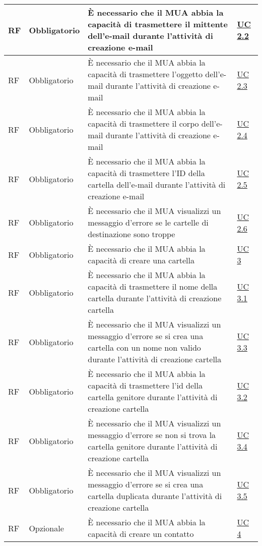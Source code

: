 \begin{longtable}{*{1}{>{\centering\arraybackslash}p{1.5cm}}*{1}{>{\centering\arraybackslash}p{2.5cm}}p{6cm}*{1}{>{\centering\arraybackslash}p{3cm}}}
    RF & Obbligatorio & È necessario che il MUA abbia la capacità di trasmettere il mittente dell'e-mail durante l'attività di creazione e-mail & \hyperref[sec:UC2.2]{UC 2.2}    \\\hline
    RF & Obbligatorio & È necessario che il MUA abbia la capacità di trasmettere l'oggetto dell'e-mail durante l'attività di creazione e-mail & \hyperref[sec:UC2.3]{UC 2.3}
    \\\hline
    RF & Obbligatorio & È necessario che il MUA abbia la capacità di trasmettere il corpo dell'e-mail durante l'attività di creazione e-mail & \hyperref[sec:UC2.4]{UC 2.4}
    \\\hline
    RF & Obbligatorio & È necessario che il MUA abbia la capacità di trasmettere l'ID della cartella dell'e-mail durante l'attività di creazione e-mail & \hyperref[sec:UC2.5]{UC 2.5}
    \\\hline
    RF & Obbligatorio & È necessario che il MUA visualizzi un messaggio d'errore se le cartelle di destinazione sono troppe & \hyperref[sec:UC2.6]{UC 2.6}
    \\\hline
    RF & Obbligatorio & È necessario che il MUA abbia la capacità di creare una cartella & \hyperref[sec:UC3]{UC 3}
    \\\hline
    RF & Obbligatorio & È necessario che il MUA abbia la capacità di trasmettere il nome della cartella durante l'attività di creazione cartella & \hyperref[sec:UC3.1]{UC 3.1}
    \\\hline
    RF & Obbligatorio & È necessario che il MUA visualizzi un messaggio d'errore se si crea una cartella con un nome non valido durante l'attività di creazione cartella & \hyperref[sec:UC3.3]{UC 3.3}
    \\\hline
    RF & Obbligatorio & È necessario che il MUA abbia la capacità di trasmettere l'id della cartella genitore durante l'attività di creazione cartella & \hyperref[sec:UC3.2]{UC 3.2}
    \\\hline
    RF & Obbligatorio & È necessario che il MUA visualizzi un messaggio d'errore se non si trova la cartella genitore durante l'attività di creazione cartella & \hyperref[sec:UC3.4]{UC 3.4} 
    \\\hline
    RF & Obbligatorio & È necessario che il MUA visualizzi un messaggio d'errore se si crea una cartella duplicata durante l'attività di creazione cartella& \hyperref[sec:UC3.5]{UC 3.5}
    \\\hline
    RF & Opzionale & È necessario che il MUA abbia la capacità di creare un contatto & \hyperref[sec:UC4]{UC 4}

\end{longtable}
